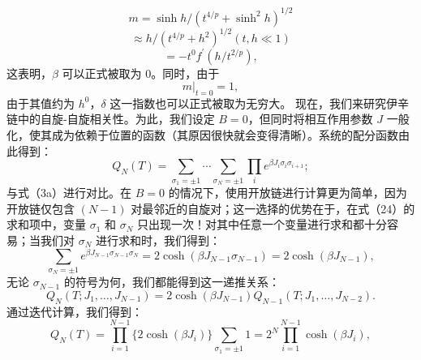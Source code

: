 \begin{equation}\tag{13.1.34}\label{eq:13.1.34}
m = \sinh h / ( t ^{4 / p} + \sinh ^{2} h ) ^{1 / 2}
\end{equation}
\begin{equation}\tag{13.1.35}\label{eq:13.1.35}
\approx h / ( t ^{4 / p} + h ^{2} ) ^{1 / 2}  ( t , h \ll 1 )
\end{equation}
\begin{equation}\tag{13.1.36}\label{eq:13.1.36}
= - t ^{0} f ^{\prime} ( h / t ^{2 / p} ) ,
\end{equation}
这表明，\(\beta\) 可以正式被取为 0。同时，由于
\begin{equation}\tag{13.1.37}\label{eq:13.1.37}
m | _ { t = 0 } = 1 ,
\end{equation}
由于其值约为 \(h^0\)，\(\delta\) 这一指数也可以正式被取为无穷大。
现在，我们来研究伊辛链中的自旋-自旋相关性。为此，我们设定 \(B=0\)，但同时将相互作用参数 \(J\) 一般化，使其成为依赖于位置的函数（其原因很快就会变得清晰）。系统的配分函数由此得到：
\begin{equation}\tag{13.1.38}\label{eq:13.1.38}
Q _ { N } ( T ) = \sum _ { \sigma _ { 1 } = \pm 1 } \cdots \sum _ { \sigma _ { N } = \pm 1 } \prod _ { i } e ^{\beta J _ { i} \sigma _ { i } \sigma _ { i + 1 } } ;
\end{equation}
与式（3a）进行对比。在 \(B=0\) 的情况下，使用开放链进行计算更为简单，因为开放链仅包含 \((N-1)\) 对最邻近的自旋对；这一选择的优势在于，在式（24）的求和项中，变量 \(\sigma_1\) 和 \(\sigma_N\) 只出现一次！对其中任意一个变量进行求和都十分容易；当我们对 \(\sigma_N\) 进行求和时，我们得到：
\begin{equation}\tag{13.1.39}\label{eq:13.1.39}
\sum _ { \sigma _ { N } = \pm 1 } e ^{\beta J _ { N - 1} \sigma _ { N - 1 } \sigma _ { N } } = 2 \cosh ( \beta J _ { N - 1 } \sigma _ { N - 1 } ) = 2 \cosh ( \beta J _ { N - 1 } ) ,
\end{equation}
无论 \(\sigma_{N-1}\) 的符号为何，我们都能得到这一递推关系：
\begin{equation}\tag{13.1.40}\label{eq:13.1.40}
Q _ { N } ( T ; J _ { 1 } , \ldots , J _ { N - 1 } ) = 2 \cosh ( \beta J _ { N - 1 } ) Q _ { N - 1 } ( T ; J _ { 1 } , \ldots , J _ { N - 2 } ) .
\end{equation}
通过迭代计算，我们得到：
\begin{equation}\tag{13.1.41}\label{eq:13.1.41}
Q _ { N } ( T ) = \prod _ { i = 1 } ^{N - 1} \{ 2 \cosh ( \beta J _ { i } ) \} \sum _ { \sigma _ { 1 } = \pm 1 } 1 = 2 ^{N} \prod _ { i = 1 } ^{N - 1} \cosh ( \beta J _ { i } ) ,
\end{equation}

